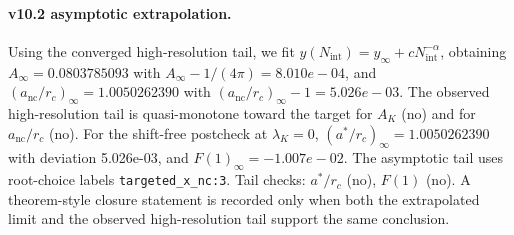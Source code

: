 \paragraph{v10.2 asymptotic extrapolation.}
Using the converged high-resolution tail, we fit $y(N_{\mathrm{int}})=y_{\infty}+cN_{\mathrm{int}}^{-\alpha}$, obtaining $A_\infty=0.0803785093$ with $A_\infty-1/(4\pi)=8.010e-04$, and $(a_{\mathrm{nc}}/r_c)_\infty=1.0050262390$ with $(a_{\mathrm{nc}}/r_c)_\infty-1=5.026e-03$. The observed high-resolution tail is quasi-monotone toward the target for $A_K$ (no) and for $a_{\mathrm{nc}}/r_c$ (no). For the shift-free postcheck at $\lambda_K=0$, $(a^*/r_c)_\infty=1.0050262390$ with deviation 5.026e-03, and $F(1)_\infty=-1.007e-02$. The asymptotic tail uses root-choice labels \texttt{targeted_x_nc:3}. Tail checks: $a^*/r_c$ (no), $F(1)$ (no). A theorem-style closure statement is recorded only when both the extrapolated limit and the
observed high-resolution tail support the same conclusion.
